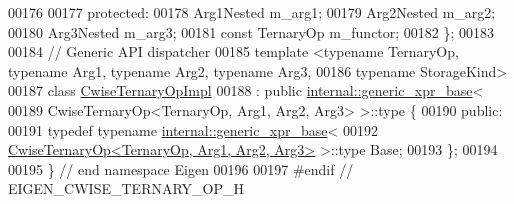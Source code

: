 \begin{DoxyCode}
00176 
00177  \textcolor{keyword}{protected}:
00178   Arg1Nested m\_arg1;
00179   Arg2Nested m\_arg2;
00180   Arg3Nested m\_arg3;
00181   \textcolor{keyword}{const} TernaryOp m\_functor;
00182 \};
00183 
00184 \textcolor{comment}{// Generic API dispatcher}
00185 \textcolor{keyword}{template} <\textcolor{keyword}{typename} TernaryOp, \textcolor{keyword}{typename} Arg1, \textcolor{keyword}{typename} Arg2, \textcolor{keyword}{typename} Arg3,
00186           \textcolor{keyword}{typename} StorageKind>
00187 \textcolor{keyword}{class }\hyperlink{class_eigen_1_1_cwise_ternary_op_impl}{CwiseTernaryOpImpl}
00188     : \textcolor{keyword}{public} \hyperlink{struct_eigen_1_1internal_1_1generic__xpr__base}{internal::generic\_xpr\_base}<
00189           CwiseTernaryOp<TernaryOp, Arg1, Arg2, Arg3> >::type \{
00190  \textcolor{keyword}{public}:
00191   \textcolor{keyword}{typedef} \textcolor{keyword}{typename} \hyperlink{struct_eigen_1_1internal_1_1generic__xpr__base}{internal::generic\_xpr\_base}<
00192       \hyperlink{group___core___module_class_eigen_1_1_cwise_ternary_op}{CwiseTernaryOp<TernaryOp, Arg1, Arg2, Arg3>} >::type Base;
00193 \};
00194 
00195 \}  \textcolor{comment}{// end namespace Eigen}
00196 
00197 \textcolor{preprocessor}{#endif  // EIGEN\_CWISE\_TERNARY\_OP\_H}
\end{DoxyCode}
